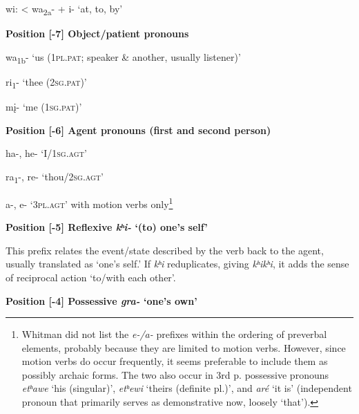 \documentclass[output=paper]{LSP/langsci}
\begin{document}
\hspace{2em} wi:   < wa\textsubscript{2a}- + i-   `at, to, by'

\vspace{1em}
\textbf{Position [-7]  Object/patient pronouns}

\hspace{2em} wa\textsubscript{1b}-    `us (\textsc{1pl.pat}; speaker \& another, usually listener)' 						      	   	   

\hspace{2em} ri\textsubscript{1}-       `thee (\textsc{2sg.pat})'								   	  	   

\hspace{2em} m\k{i}-      `me (\textsc{1sg.pat})'                         

\vspace{1em}
\textbf{Position [-6]  Agent pronouns (first and second person)} 	

\hspace{2em} ha-, he-  `I/\textsc{1sg.agt}'										

\hspace{2em} ra\textsubscript{1}-, re-   `thou/\textsc{2sg.agt}'				          	    			

\hspace{2em} a-, e- `\textsc{3pl.agt}'  with motion verbs only\footnote{Whitman did not list the \textit{e-/a-} prefixes within the ordering of preverbal elements, probably because they are limited to motion verbs. However, since motion verbs do occur frequently, it seems preferable to include them as possibly archaic forms. The two also occur in 3rd p. possessive pronouns \textit{etʰawe} `his (singular)', \textit{etʰewi} `theirs (definite pl.)', and \textit{aré} `it is' (independent pronoun that primarily serves as demonstrative now, loosely `that').} 	        	        

\vspace{1em}
\textbf{Position [-5]  Reflexive \textit{kʰi-}  `(to) one's self'}		
				     		     	       
This prefix relates the event/state described by the verb back to the agent, usually translated as `one's self.' If \textit{kʰi} reduplicates, giving \textit{kʰikʰi}, it adds the sense of reciprocal action `to/with each other'.  

\vspace{1em}
\textbf{Position [-4] Possessive  \textit{gra-}  `one's own'}	
						      
\end{document}
